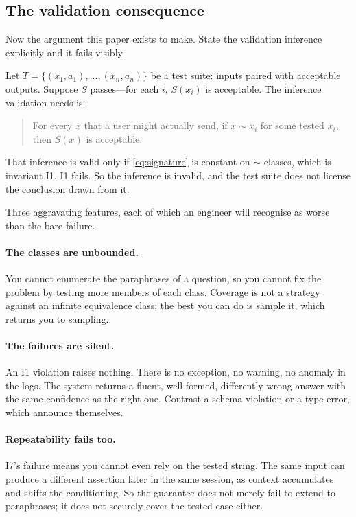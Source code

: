 \documentclass[11pt]{article}
\theoremstyle{plain}
\theoremstyle{definition}
\begin{document}
\subsection{The validation consequence}
\label{sec:validation-consequence}

Now the argument this paper exists to make. State the validation inference
explicitly and it fails visibly.

Let $T = \{(x_1, a_1), \ldots, (x_n, a_n)\}$ be a test suite: inputs paired with
acceptable outputs. Suppose $S$ passes---for each $i$, $S(x_i)$ is acceptable. The
inference validation needs is:

\begin{quote}
For every $x$ that a user might actually send, if $x \sim x_i$ for some tested
$x_i$, then $S(x)$ is acceptable.
\end{quote}

That inference is valid only if \eqref{eq:signature} is constant on $\sim$-classes,
which is invariant I1. I1 fails. So the inference is invalid, and the test suite
does not license the conclusion drawn from it.

Three aggravating features, each of which an engineer will recognise as worse than
the bare failure.

\paragraph{The classes are unbounded.} You cannot enumerate the paraphrases of a
question, so you cannot fix the problem by testing more members of each class.
Coverage is not a strategy against an infinite equivalence class; the best you can
do is sample it, which returns you to sampling.

\paragraph{The failures are silent.} An I1 violation raises nothing. There is no
exception, no warning, no anomaly in the logs. The system returns a fluent,
well-formed, differently-wrong answer with the same confidence as the right one.
Contrast a schema violation or a type error, which announce themselves.

\paragraph{Repeatability fails too.} I7's failure means you cannot even rely on
the tested string. The same input can produce a different assertion later in the
same session, as context accumulates and shifts the conditioning. So the guarantee
does not merely fail to extend to paraphrases; it does not securely cover the
tested case either.
\end{document}
